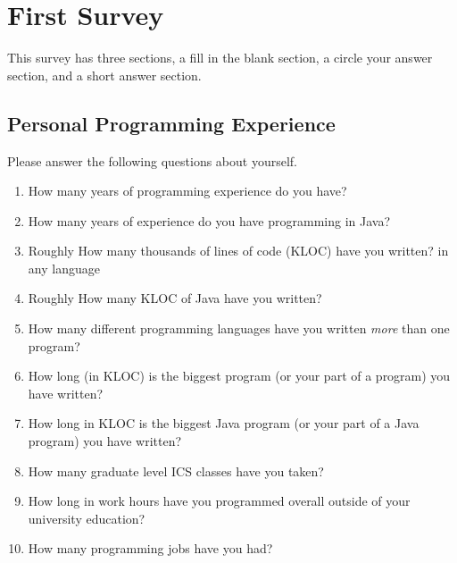 \chapter{First Survey}
This survey has three sections, a fill in the blank section, a circle your
answer section, and a short answer section.
\section*{Personal Programming Experience}
Please answer the following questions about yourself.

\begin{enumerate}
\item{How many years of programming experience do you have?}
\item{How many years of experience do you have programming in Java? }
\item{Roughly How many thousands of lines of code (KLOC) have you written? in 
any language}
\item{Roughly How many KLOC of Java have you written?}
\item{How many different programming languages have you written {\em more} than 
one program?}
\item{How long (in KLOC) is the biggest program (or your part of a program) you 
have written?}
\item{How long in KLOC is the biggest Java program (or your part of a Java
program) you have written?}
\item{How many graduate level ICS classes have you taken?}
\item{How long in work hours have you programmed overall outside of your
university education?}
\item{How many programming jobs have you had?}
\end{enumerate}


